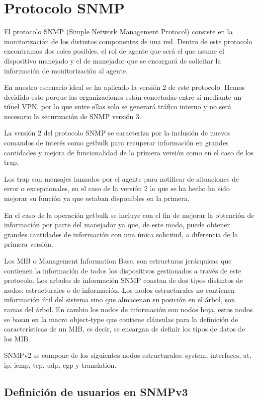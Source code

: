 \documentclass[a4paper]{article}
\begin{document}
\section{Protocolo SNMP}

El protocolo SNMP (Simple Network Management Protocol) consiste en la monitorización de los distintos componentes de una red. Dentro de este protocolo encontramos dos roles posibles, el rol de agente que será el que asume el dispositivo manejado y el de manejador que se encargará de solicitar la información de monitorización al agente.


 En nuestro escenario ideal se ha aplicado la versión 2 de este protocolo. Hemos decidido esto porque las organizaciones están conectadas entre sí mediante un túnel VPN, por lo que entre ellas solo se generará tráfico interno y no será necesario la securización de SNMP versión 3. 

La versión 2 del protocolo SNMP se caracteriza por la inclusión de nuevos comandos de interés como getbulk para recuperar información en grandes cantidades y mejora de funcionalidad de la primera versión como en el caso de los trap.

Los trap son mensajes lanzados por el agente para notificar de situaciones de error o excepcionales, en el caso de la versión 2 lo que se ha hecho ha sido mejorar su función ya que estaban disponibles en la primera.

En el caso de la operación getbulk se incluye con el fin de mejorar la obtención de información por parte del manejador ya que, de este modo, puede obtener grandes cantidades de información con una única solicitud, a diferencia de la primera versión.

Los MIB o Management Information Base, son estructuras jerárquicas que contienen la información de todos los dispositivos gestionados a través de este protocolo. Los arboles de información SNMP constan de dos tipos distintos de nodos: estructurales o de información. Los nodos estructurales no contienen información útil del sistema sino que almacenan su posición en el árbol, son ramas del árbol. En cambio los nodos de información son nodos hoja, estos nodos se basan en la macro object-type que contiene cláusulas para la definición de características de un MIB, es decir, se encargan de definir los tipos de datos de los MIB.

SNMPv2 se compone de los siguientes nodos estructurales: system, interfaces, at, ip, icmp, tcp, udp, egp y translation.  

\subsection{Definición de usuarios en SNMPv3}
\end{document}
